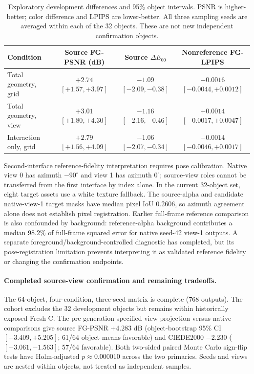 \begin{table}[ht]
\centering\scriptsize
\begin{tabular}{lccc}
\toprule
Condition & Source FG-PSNR (dB) & Source $\Delta E_{00}$ & Nonreference FG-LPIPS \\
\midrule
Total geometry, grid & $+2.74$ $[+1.57,+3.97]$ & $-1.09$ $[-2.09,-0.38]$ & $-0.0016$ $[-0.0044,+0.0012]$ \\
Total geometry, view & $+3.01$ $[+1.80,+4.30]$ & $-1.16$ $[-2.16,-0.46]$ & $+0.0014$ $[-0.0017,+0.0047]$ \\
Interaction only, grid & $+2.79$ $[+1.56,+4.09]$ & $-1.06$ $[-2.07,-0.34]$ & $-0.0014$ $[-0.0046,+0.0017]$ \\
\bottomrule
\end{tabular}
\caption{Exploratory development differences and 95\% object intervals.
PSNR is higher-better; color difference and LPIPS are lower-better. All three
sampling seeds are averaged within each of the 32 objects. These are not new
independent confirmation objects.}
\label{tab:development012}
\end{table}

Second-interface reference-fidelity interpretation requires pose calibration. Native
view 0 has azimuth $-90^\circ$ and view 1 has azimuth $0^\circ$; source-view roles
cannot be transferred from the first interface by index alone. In the current
32-object set, eight target assets use a white texture fallback. The source-alpha
and candidate native-view-1 target masks have median pixel IoU 0.2606, so azimuth
agreement alone does not establish pixel registration. Earlier full-frame
reference comparison is also confounded by background: reference-alpha
background contributes a median 98.2\% of full-frame squared error for native
seed-42 view-1 outputs. A separate foreground/background-controlled diagnostic
has completed, but its pose-registration limitation prevents interpreting it as
validated reference fidelity or changing the confirmation endpoints.

\paragraph{Completed source-view confirmation and remaining tradeoffs.}
The 64-object, four-condition, three-seed matrix is complete (768 outputs).
The cohort excludes the 32 development objects but remains within historically
exposed Fresh C. The pre-generation specified view-projection versus native
comparisons give source FG-PSNR $+4.283$ dB (object-bootstrap 95\% CI
$[+3.409,+5.205]$; 61/64 object means favorable) and CIEDE2000 $-2.230$
($[-3.061,-1.563]$; 57/64 favorable). Both two-sided paired Monte Carlo
sign-flip tests have Holm-adjusted $p\approx 0.000010$ across the two primaries.
Seeds and views are nested within objects, not treated as independent samples.

